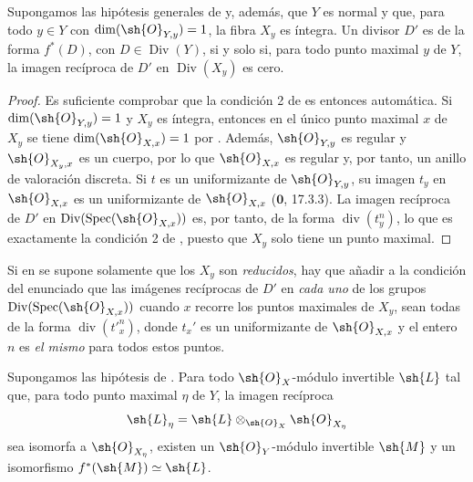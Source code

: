 \begin{corollary}[21.4.11]
\ifdefined\EGAIVSuppressErratumLabels\else\label{IV.21.4.11}\fi
Supongamos las hipótesis generales de {} y, además, que
$Y$ es normal y que, para todo $y\in Y$ con
$\dim(\sh{O}_{Y,y})=1$, la fibra $X_y$ es íntegra. Un divisor $D'$ es
de la forma $f^*(D)$, con $D\in\operatorname{Div}(Y)$, si y solo si,
para todo punto maximal $y$ de $Y$, la imagen recíproca de $D'$ en
$\operatorname{Div}(X_y)$ es cero.
\end{corollary}

\begin{proof}
Es suficiente comprobar que la condición 2\textdegree{} de {} es entonces
automática. Si $\dim(\sh{O}_{Y,y})=1$ y $X_y$ es íntegra, entonces en
el único punto maximal $x$ de $X_y$ se tiene
$\dim(\sh{O}_{X,x})=1$ por {}. Además,
$\sh{O}_{Y,y}$ es regular y $\sh{O}_{X_y,x}$ es un cuerpo, por lo que
$\sh{O}_{X,x}$ es regular {} y, por tanto, un anillo de valoración discreta.
Si $t$ es un uniformizante de $\sh{O}_{Y,y}$, su imagen $t_y$ en
$\sh{O}_{X,x}$ es un uniformizante de $\sh{O}_{X,x}$
($\mathbf 0$, 17.3.3). La imagen recíproca de $D'$ en
$\operatorname{Div}(\operatorname{Spec}(\sh{O}_{X,x}))$ es, por tanto,
de la forma $\operatorname{div}(t_y^n)$, lo que es exactamente la condición
2\textdegree{} de {}, puesto que $X_y$ solo tiene un punto maximal.
\end{proof}

\begin{remark}[21.4.12]
\ifdefined\EGAIVSuppressErratumLabels\else\label{IV.21.4.12}\fi
Si en {} se supone solamente que los $X_y$ son \emph{reducidos}, hay que
añadir a la condición del enunciado que las imágenes recíprocas de $D'$
en \emph{cada uno} de los grupos
$\operatorname{Div}(\operatorname{Spec}(\sh{O}_{X,x}))$ cuando $x$
recorre los puntos maximales de $X_y$, sean todas de la forma
$\operatorname{div}(t'^n_x)$, donde $t_x'$ es un uniformizante de
$\sh{O}_{X,x}$ y el entero $n$ es \emph{el mismo} para todos estos puntos.
\end{remark}

\begin{corollary}[21.4.13]
\ifdefined\EGAIVSuppressErratumLabels\else\label{IV.21.4.13}\fi
Supongamos las hipótesis de \textup{}. Para todo
$\sh{O}_X$-módulo invertible $\sh{L}$ tal que, para todo punto maximal $\eta$ de
$Y$, la imagen recíproca
\[
 \sh{L}_\eta
 =\sh{L}\otimes_{\sh{O}_X}\sh{O}_{X_\eta}
\]
sea isomorfa a $\sh{O}_{X_\eta}$, existen un
$\sh{O}_Y$-módulo invertible $\sh{M}$ y un isomorfismo
$f^*(\sh{M})\simeq\sh{L}$.
\end{corollary}

